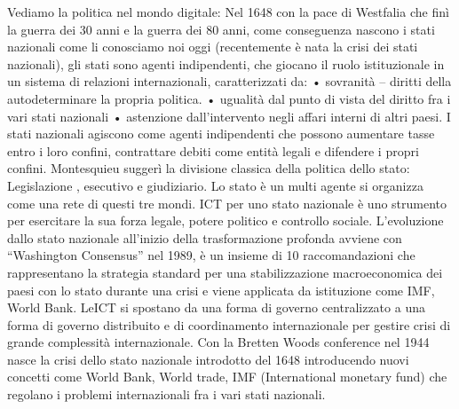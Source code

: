 \documentclass[11pt, a4page, twocolumn]{article}
\begin{document}
Vediamo la politica nel mondo digitale:
Nel 1648 con la pace di Westfalia che finì la guerra dei 30 anni e la guerra dei 80 anni, come conseguenza nascono i stati nazionali come li conosciamo noi oggi (recentemente è nata la crisi dei stati nazionali), gli stati sono agenti indipendenti, che giocano il ruolo istituzionale in un sistema di relazioni internazionali, caratterizzati da:
    • sovranità – diritti della autodeterminare la propria politica.
    • ugualità dal punto di vista del diritto fra i vari stati nazionali
    • astenzione dall’intervento negli affari interni di altri paesi.
I stati nazionali agiscono come agenti indipendenti che possono aumentare tasse entro i loro confini, contrattare debiti come entità legali e difendere i propri confini.
Montesquieu suggerì la divisione classica della politica dello stato: Legislazione , esecutivo e giudiziario. Lo stato è un multi agente si organizza come una rete di questi tre mondi. ICT per uno stato nazionale è uno strumento per esercitare la sua forza legale, potere politico e controllo sociale.
L’evoluzione dallo stato nazionale all’inizio della trasformazione profonda avviene con “Washington Consensus” nel 1989, è un insieme di 10 raccomandazioni che rappresentano la strategia standard per una stabilizzazione macroeconomica dei paesi con lo stato durante una crisi e viene applicata da istituzione come IMF, World Bank. LeICT si spostano da una forma di governo centralizzato a una forma di governo distribuito e di coordinamento internazionale per gestire crisi di grande complessità internazionale.
Con la Bretten Woods conference nel 1944 nasce la crisi dello stato nazionale introdotto del 1648 introducendo nuovi concetti come World Bank, World trade, IMF (International monetary fund) che regolano i problemi internazionali fra i vari stati nazionali.
\end{document}
